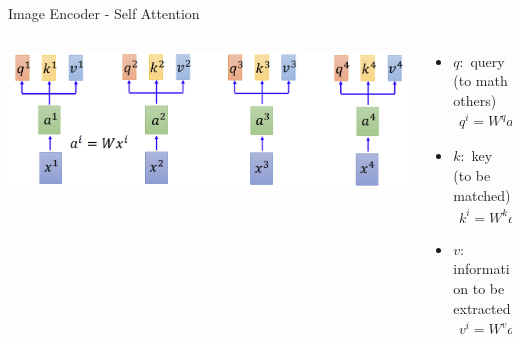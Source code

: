 \documentclass[aspectratio=169,xcolor=dvipsnames]{beamer}
\begin{document}
\begin{frame}{Image Encoder - Self Attention}
    \begin{columns}
        \begin{column}{0.6\textwidth}
        \includegraphics[width=1\textwidth]{figures/self_attention_matrix.png}
        \end{column}
        \begin{column}{0.4\textwidth}
            \begin{itemize}
                \item $q:$ query (to math others)
                \begin{align*}
                    q^i = W^{q}a^i
                \end{align*}
                \item $k:$ key (to be matched)
                \begin{align*}
                    k^i = W^{k}a^i
                \end{align*}
                \item $v:$ information to be extracted
                \begin{align*}
                    v^i = W^{v}a^i
                \end{align*}
            \end{itemize}
        \end{column}
    \end{columns}
\end{frame}

\end{document}
